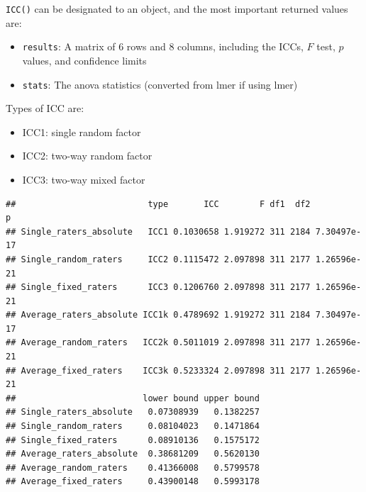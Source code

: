 \documentclass[
]{ctexart}
\newenvironment{Shaded}{\begin{snugshade}}{\end{snugshade}}
\newcommand{\CommentTok}[1]{\textcolor[rgb]{0.56,0.35,0.01}{\textit{#1}}}
\newcommand{\NormalTok}[1]{#1}
\newcommand{\SpecialCharTok}[1]{\textcolor[rgb]{0.81,0.36,0.00}{\textbf{#1}}}
\providecommand{\tightlist}{%
  \setlength{\itemsep}{0pt}\setlength{\parskip}{0pt}}
\begin{document}
\texttt{ICC()} can be designated to an object, and the most important
returned values are:

\begin{itemize}
\tightlist
\item
  \texttt{results}: A matrix of 6 rows and 8 columns, including the
  ICCs, \(F\) test, \(p\) values, and confidence limits
\item
  \texttt{stats}: The anova statistics (converted from lmer if using
  lmer)
\end{itemize}

Types of ICC are:

\begin{itemize}
\tightlist
\item
  ICC1: single random factor
\item
  ICC2: two-way random factor
\item
  ICC3: two-way mixed factor
\end{itemize}

\begin{Shaded}
\end{Shaded}

\begin{verbatim}
##                          type       ICC        F df1  df2           p
## Single_raters_absolute   ICC1 0.1030658 1.919272 311 2184 7.30497e-17
## Single_random_raters     ICC2 0.1115472 2.097898 311 2177 1.26596e-21
## Single_fixed_raters      ICC3 0.1206760 2.097898 311 2177 1.26596e-21
## Average_raters_absolute ICC1k 0.4789692 1.919272 311 2184 7.30497e-17
## Average_random_raters   ICC2k 0.5011019 2.097898 311 2177 1.26596e-21
## Average_fixed_raters    ICC3k 0.5233324 2.097898 311 2177 1.26596e-21
##                         lower bound upper bound
## Single_raters_absolute   0.07308939   0.1382257
## Single_random_raters     0.08104023   0.1471864
## Single_fixed_raters      0.08910136   0.1575172
## Average_raters_absolute  0.38681209   0.5620130
## Average_random_raters    0.41366008   0.5799578
## Average_fixed_raters     0.43900148   0.5993178
\end{verbatim}

\begin{Shaded}
\end{Shaded}
\end{document}
